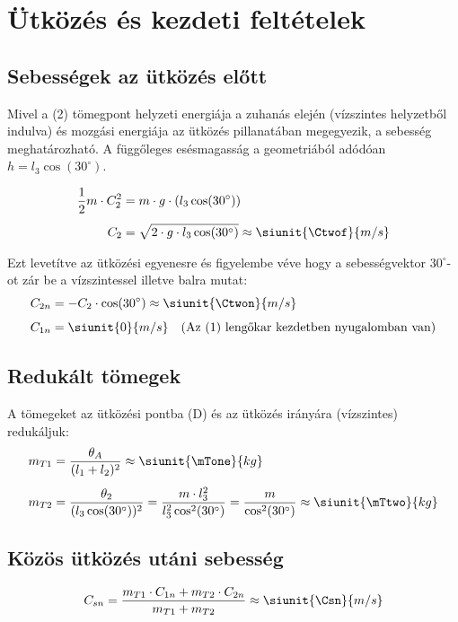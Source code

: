 \section{Ütközés és kezdeti feltételek}

\collisiondiagram
\pendulumszta

\newpage

\subsection{Sebességek az ütközés előtt}
Mivel a (2) tömegpont helyzeti energiája a zuhanás elején (vízszintes helyzetből indulva) és mozgási energiája az ütközés pillanatában megegyezik, a sebesség meghatározható. A függőleges esésmagasság a geometriából adódóan $h = l_3 \cos(30^\circ)$.

\begin{align}
    \frac{1}{2} m \cdot C_2^2 & = m \cdot g \cdot (l_3 \cos(30^\circ))                                   \\[1ex]
    C_2                       & = \sqrt{2 \cdot g \cdot l_3 \cos(30^\circ)} \approx \siunit{\Ctwof}{m/s}
\end{align}

Ezt levetítve az ütközési egyenesre és figyelembe véve hogy a sebességvektor $30^\circ$-ot zár be a vízszintessel illetve balra mutat:
\begin{align}
    C_{2n} & = -C_2 \cdot \cos(30^\circ) \approx \siunit{\Ctwon}{m/s}                   \\[1ex]
    C_{1n} & = \siunit{0}{m/s} \quad \text{(Az (1) lengőkar kezdetben nyugalomban van)}
\end{align}

\subsection{Redukált tömegek}
A tömegeket az ütközési pontba (D) és az ütközés irányára (vízszintes) redukáljuk:
\begin{align}
    m_{T1} & = \frac{\theta_A}{(l_1 + l_2)^2} \approx \siunit{\mTone}{kg}                                                                                      \\[1ex]
    m_{T2} & = \frac{\theta_2}{(l_3 \cos(30^\circ))^2} = \frac{m \cdot l_3^2}{l_3^2 \cos^2(30^\circ)} = \frac{m}{\cos^2(30^\circ)} \approx \siunit{\mTtwo}{kg}
\end{align}

\subsection{Közös ütközés utáni sebesség}
\begin{equation}
    C_{sn} = \frac{m_{T1} \cdot C_{1n} + m_{T2} \cdot C_{2n}}{m_{T1} + m_{T2}} \approx \siunit{\Csn}{m/s}
\end{equation}

